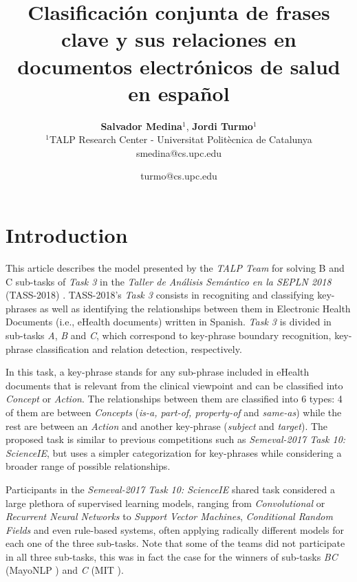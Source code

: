 \documentclass[a4paper,11pt,twocolumn,twoside]{article}
\title{Clasificación conjunta de frases clave y sus relaciones en documentos electrónicos de salud en español}
\author {\textbf{Salvador Medina$^1$}, \textbf{Jordi Turmo$^1$}\\
$^1$TALP Research Center - Universitat Politècnica de Catalunya\\
smedina@cs.upc.edu \and turmo@cs.upc.edu \\
}
\begin{document}



\label{firstpage} 

\maketitle

\medskip

%

\section{Introduction}
\label{sec:introduction}

This article describes the model presented by the \emph{TALP Team} for solving B and C sub-tasks of \emph{Task 3} in the \emph{Taller de Análisis Semántico en la SEPLN 2018} (TASS-2018) \cite{overview_tass2018}. TASS-2018's \emph{Task 3} consists in recogniting and classifying key-phrases as well as identifying the relationships between them in Electronic Health Documents (i.e., eHealth documents) written in Spanish. \emph{Task 3} is divided in sub-tasks \emph{A}, \emph{B} and \emph{C}, which correspond to key-phrase boundary recognition, key-phrase classification and relation detection, respectively.

In this task, a key-phrase stands for any sub-phrase included in eHealth documents that is relevant from the clinical viewpoint and can be classified into \emph{Concept} or \emph{Action}. The relationships between them are classified into 6 types: 4 of them are between \emph{Concepts} (\emph{is-a, part-of, property-of} and \emph{same-as}) while the rest are between an \emph{Action} and another key-phrase (\emph{subject} and \emph{target}). The proposed task is similar to previous competitions such as \emph{Semeval-2017 Task 10: ScienceIE}\cite{gonzalez2017capturing}, but uses a simpler categorization for key-phrases while considering a broader range of possible relationships.

Participants in the \emph{Semeval-2017 Task 10: ScienceIE}\cite{gonzalez2017capturing} shared task considered a large plethora of supervised learning models, ranging from \emph{Convolutional} or \emph{Recurrent Neural Networks} to \emph{Support Vector Machines}, \emph{Conditional Random Fields} and even rule-based systems, often applying radically different models for each one of the three sub-tasks. Note that some of the teams did not participate in all three sub-tasks, this was in fact the case for the winners of sub-tasks \emph{BC} (MayoNLP \cite{liu2017mayonlp}) and \emph{C} (MIT \cite{lee2017semeval}).
\end{document}
